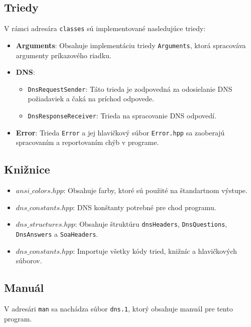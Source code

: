 \documentclass[a4paper, 11pt]{article}
\begin{document}
	\subsection{Triedy}
	V rámci adresára \texttt{classes} sú implementované nasledujúce triedy:
	
	\begin{itemize}
		\item \textbf{Arguments}: Obsahuje implementáciu triedy \texttt{Arguments}, ktorá spracováva argumenty príkazového riadku.
		\item \textbf{DNS}:
		\begin{itemize}
			\item \texttt{DnsRequestSender}: Táto trieda je zodpovedná za odosielanie DNS požiadaviek a čaká na príchod odpovede.
			\item \texttt{DnsResponseReceiver}: Trieda na spracovanie DNS odpovedí.
		\end{itemize}
		\item \textbf{Error}: Trieda \texttt{Error} a jej hlavičkový súbor \texttt{Error.hpp} sa zaoberajú spracovaním a reportovaním chýb v programe.
	\end{itemize}
	
	\subsection{Knižnice}
	\begin{itemize}
		\item \textbf{$ansi\_colors.hpp$}: Obsahuje farby, ktoré sú použité na štandartnom výstupe.
		\item \textbf{$dns\_constants.hpp$}: DNS konštanty potrebné pre chod programu.
		\item \textbf{$dns\_structures.hpp$}: Obsahuje štruktúru \texttt{dnsHeaders},  \texttt{DnsQuestions}, \texttt{DnsAnswers} a \texttt{SoaHeaders}.
		\item \textbf{$dns\_constants.hpp$}: Importuje všetky kódy tried, knižníc a hlavičkových súborov.
	\end{itemize}
	
	\subsection{Manuál}
	V adresári \texttt{man} sa nachádza súbor \texttt{dns.1}, ktorý obsahuje manuál pre tento program.

\end{document}

